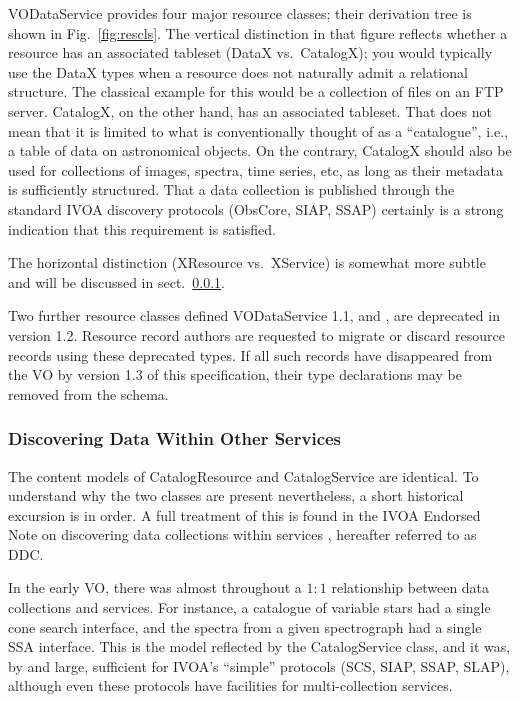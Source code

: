 \documentclass[11pt,a4paper]{ivoa}
\begin{document}
VODataService provides four major resource classes; their derivation
tree is shown in Fig.~\ref{fig:rescls}.  The vertical distinction in
that figure reflects whether a resource has an associated tableset
(DataX vs.~CatalogX); you would typically use the DataX types when a
resource does not naturally admit a relational structure.  The classical
example for this would be a collection of files on an FTP server.  CatalogX,
on the other hand, has an associated tableset.  That does not mean that
it is limited to what is conventionally thought of as a ``catalogue'',
i.e., a table of data on astronomical objects.  On the
contrary, CatalogX should also be used for collections of images,
spectra, time series, etc, as long as their metadata is sufficiently
structured.  That a data collection is published through the standard
IVOA discovery protocols (ObsCore,
SIAP, SSAP) certainly is a strong indication that this requirement is
satisfied.

The horizontal distinction (XResource vs.~XService) is somewhat more
subtle and will be discussed in sect.~\ref{sect:discoverdata}.

Two further resource classes defined VODataService 1.1,
 and , 
are deprecated in version 1.2.  
Resource record authors are requested to migrate or discard resource
records using these deprecated types.  If all such records have
disappeared from the VO by version 1.3 of this specification, their
type declarations may be removed from the schema.

\subsubsection{Discovering Data Within Other Services}
\label{sect:discoverdata}

The content models of CatalogResource and CatalogService are identical.
To understand why the two classes are present nevertheless, a short
historical excursion is in order.  A full treatment of this is found in
the IVOA Endorsed Note on discovering data collections within services
\citep{2019ivoa.rept.0520D}, hereafter referred to as DDC.

In the early VO, there was almost throughout a $1:1$ relationship between
data collections and services.  For instance, a catalogue of variable
stars had a single cone search interface, and the spectra from a given
spectrograph had a single SSA interface.  This is the model reflected by
the CatalogService class, and it was, by and large, sufficient for
IVOA's ``simple'' protocols (SCS, SIAP, SSAP, SLAP), although even these
protocols have facilities for multi-collection services.
\end{document}
